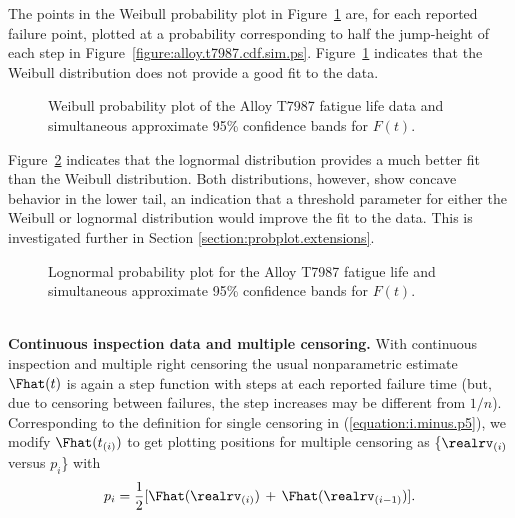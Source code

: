 \begin{example}
The points in the Weibull probability plot in
Figure~\ref{figure:alloy.t7987.npp.weib.ps} are, for each reported
failure point, plotted at a probability corresponding to half the
jump-height of each step in
Figure~\ref{figure:alloy.t7987.cdf.sim.ps}. 
Figure~\ref{figure:alloy.t7987.npp.weib.ps} indicates
that the Weibull distribution does not provide a good fit to the
data.
\begin{figure}
\caption{Weibull probability plot
of the Alloy T7987 fatigue life data and
simultaneous approximate 95\% confidence bands for $F(t)$.}
\label{figure:alloy.t7987.npp.weib.ps}
\end{figure}
Figure~\ref{figure:alloy.t7987.npp.lnor.ps}
indicates that the lognormal distribution provides a much better fit
than the Weibull distribution. Both distributions, however, show
concave behavior in the lower tail, an indication that a threshold parameter
for either the Weibull or lognormal distribution
would improve the fit to the data. This is investigated further
in Section \ref{section:probplot.extensions}.
\begin{figure}
\caption{Lognormal probability plot
for the Alloy T7987
fatigue life and
simultaneous approximate 95\% confidence bands for $F(t)$.}
\label{figure:alloy.t7987.npp.lnor.ps}
\end{figure}
\end{example}


\mbox{ }\\
\noindent
{\bf Continuous inspection data and multiple censoring.}
With continuous inspection and multiple right censoring 
the usual nonparametric estimate $\Fhat(t)$
is again a step function with steps at each reported failure time 
(but, due to censoring
between failures, the step increases may be different from $1/n$).
Corresponding to the definition for
single censoring in (\ref{equation:i.minus.p5}), we modify $\Fhat(t_{(i)})$
to get plotting positions for multiple censoring as \{$\realrv_{(i)}$ versus
$p_{i}$\} with
\begin{equation}
\label{equation:averagekm}
 p_{i}=\frac{1}{2} [\Fhat (\realrv_{(i)})\, 
+ \,\Fhat (\realrv_{(i-1)})].
\end{equation}


